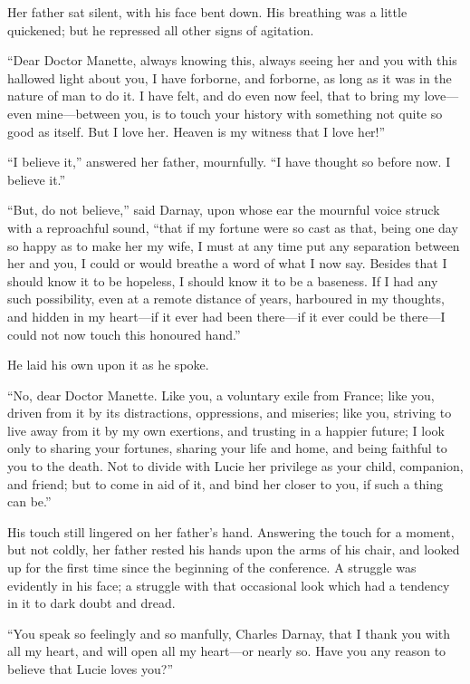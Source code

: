 Her father sat silent, with his face bent down.  His breathing was a
little quickened; but he repressed all other signs of agitation.

``Dear Doctor Manette, always knowing this, always seeing her and you
with this hallowed light about you, I have forborne, and forborne,
as long as it was in the nature of man to do it.  I have felt, and do
even now feel, that to bring my love---even mine---between you, is to
touch your history with something not quite so good as itself.
But I love her.  Heaven is my witness that I love her!''

``I believe it,'' answered her father, mournfully.  ``I have thought so
before now.  I believe it.''

``But, do not believe,'' said Darnay, upon whose ear the mournful voice
struck with a reproachful sound, ``that if my fortune were so cast as
that, being one day so happy as to make her my wife, I must at any
time put any separation between her and you, I could or would breathe
a word of what I now say.  Besides that I should know it to be
hopeless, I should know it to be a baseness.  If I had any such
possibility, even at a remote distance of years, harboured in my
thoughts, and hidden in my heart---if it ever had been there---if it
ever could be there---I could not now touch this honoured hand.''

He laid his own upon it as he spoke.

``No, dear Doctor Manette.  Like you, a voluntary exile from France;
like you, driven from it by its distractions, oppressions, and
miseries; like you, striving to live away from it by my own exertions,
and trusting in a happier future; I look only to sharing your fortunes,
sharing your life and home, and being faithful to you to the death.
Not to divide with Lucie her privilege as your child, companion, and
friend; but to come in aid of it, and bind her closer to you, if such
a thing can be.''

His touch still lingered on her father's hand.  Answering the touch
for a moment, but not coldly, her father rested his hands upon the
arms of his chair, and looked up for the first time since the
beginning of the conference.  A struggle was evidently in his face;
a struggle with that occasional look which had a tendency in it to
dark doubt and dread.

``You speak so feelingly and so manfully, Charles Darnay, that I thank
you with all my heart, and will open all my heart---or nearly so.
Have you any reason to believe that Lucie loves you?''

